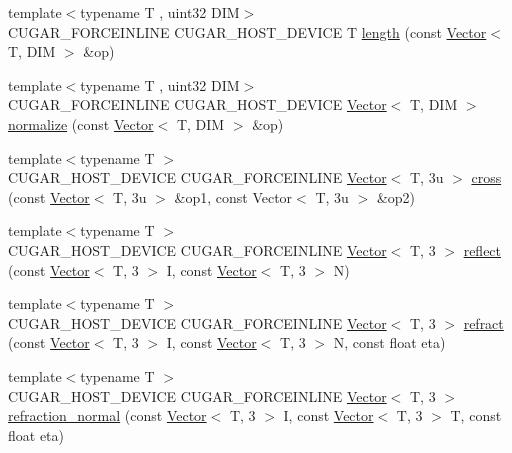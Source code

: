\begin{DoxyCompactItemize}
\item 
{\footnotesize template$<$typename T , uint32 D\+IM$>$ }\\C\+U\+G\+A\+R\+\_\+\+F\+O\+R\+C\+E\+I\+N\+L\+I\+NE C\+U\+G\+A\+R\+\_\+\+H\+O\+S\+T\+\_\+\+D\+E\+V\+I\+CE T \hyperlink{group___vectors_module_gae8f08ae6e6dc212eb407dd3a13c06bd8}{length} (const \hyperlink{structcugar_1_1_vector}{Vector}$<$ T, D\+IM $>$ \&op)
\item 
{\footnotesize template$<$typename T , uint32 D\+IM$>$ }\\C\+U\+G\+A\+R\+\_\+\+F\+O\+R\+C\+E\+I\+N\+L\+I\+NE C\+U\+G\+A\+R\+\_\+\+H\+O\+S\+T\+\_\+\+D\+E\+V\+I\+CE \hyperlink{structcugar_1_1_vector}{Vector}$<$ T, D\+IM $>$ \hyperlink{group___vectors_module_ga0db9153dc023976fdf7f5d7edba12344}{normalize} (const \hyperlink{structcugar_1_1_vector}{Vector}$<$ T, D\+IM $>$ \&op)
\item 
{\footnotesize template$<$typename T $>$ }\\C\+U\+G\+A\+R\+\_\+\+H\+O\+S\+T\+\_\+\+D\+E\+V\+I\+CE C\+U\+G\+A\+R\+\_\+\+F\+O\+R\+C\+E\+I\+N\+L\+I\+NE \hyperlink{structcugar_1_1_vector}{Vector}$<$ T, 3u $>$ \hyperlink{group___vectors_module_ga2a5c1ab56c232bc5ab7c39a2837d0ca5}{cross} (const \hyperlink{structcugar_1_1_vector}{Vector}$<$ T, 3u $>$ \&op1, const Vector$<$ T, 3u $>$ \&op2)
\item 
{\footnotesize template$<$typename T $>$ }\\C\+U\+G\+A\+R\+\_\+\+H\+O\+S\+T\+\_\+\+D\+E\+V\+I\+CE C\+U\+G\+A\+R\+\_\+\+F\+O\+R\+C\+E\+I\+N\+L\+I\+NE \hyperlink{structcugar_1_1_vector}{Vector}$<$ T, 3 $>$ \hyperlink{group___vectors_module_ga562d2772848ffc2e393bf70e63e3ae1d}{reflect} (const \hyperlink{structcugar_1_1_vector}{Vector}$<$ T, 3 $>$ I, const \hyperlink{structcugar_1_1_vector}{Vector}$<$ T, 3 $>$ N)
\item 
{\footnotesize template$<$typename T $>$ }\\C\+U\+G\+A\+R\+\_\+\+H\+O\+S\+T\+\_\+\+D\+E\+V\+I\+CE C\+U\+G\+A\+R\+\_\+\+F\+O\+R\+C\+E\+I\+N\+L\+I\+NE \hyperlink{structcugar_1_1_vector}{Vector}$<$ T, 3 $>$ \hyperlink{group___vectors_module_ga1ac246c46e1d0dd6b35a69046db3673f}{refract} (const \hyperlink{structcugar_1_1_vector}{Vector}$<$ T, 3 $>$ I, const \hyperlink{structcugar_1_1_vector}{Vector}$<$ T, 3 $>$ N, const float eta)
\item 
{\footnotesize template$<$typename T $>$ }\\C\+U\+G\+A\+R\+\_\+\+H\+O\+S\+T\+\_\+\+D\+E\+V\+I\+CE C\+U\+G\+A\+R\+\_\+\+F\+O\+R\+C\+E\+I\+N\+L\+I\+NE \hyperlink{structcugar_1_1_vector}{Vector}$<$ T, 3 $>$ \hyperlink{group___vectors_module_ga327ba98b7cb9214bd6cf2199543fc0ee}{refraction\+\_\+normal} (const \hyperlink{structcugar_1_1_vector}{Vector}$<$ T, 3 $>$ I, const \hyperlink{structcugar_1_1_vector}{Vector}$<$ T, 3 $>$ T, const float eta)

\end{DoxyCompactItemize}
